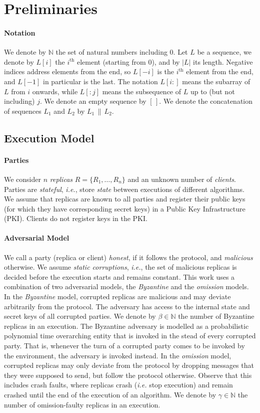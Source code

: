 \documentclass[pdflatex,sn-mathphys-num]{sn-jnl}%
\theoremstyle{thmstyleone}%
\theoremstyle{thmstyletwo}%
\theoremstyle{thmstylethree}%
\newcommand{\concat}{\,\|\,}
\newcommand{\BN}{\ensuremath{\mathbb{N}}\xspace}
\newcommand{\replicas}{\ensuremath{R}\xspace}
\newcommand{\dotparagraph}[1]{\paragraph*{#1}}
\let\oldbeta\beta
\renewcommand{\beta}{\ensuremath{\oldbeta}\xspace}
\let\oldgamma\gamma
\renewcommand{\gamma}{\ensuremath{\oldgamma}\xspace}
\begin{document}
\section{Preliminaries}

\dotparagraph{Notation}
We denote by \BN the set of natural numbers including $0$.
Let $L$ be a sequence, we denote by $L[i]$ the $i^\text{th}$ element (starting from $0$),
and by $|L|$ its length.
Negative indices address elements from the end, so $L[-i]$ is the $i^\text{th}$ element from
the end, and $L[-1]$ in particular is the last.
The notation $L[i{:}]$ means the
subarray of $L$ from $i$ onwards, while $L[{:}j]$ means the subsequence of $L$ up to (but not including) $j$.
We denote an empty sequence by $[\,]$.
We denote the concatenation of sequences $L_1$ and $L_2$ by $L_1 \concat L_2$.

\subsection{Execution Model}\label{sec:system}

\dotparagraph{\textbf{Parties}}
We consider $n$ \emph{replicas} $\replicas=\{\replicas_1,\ldots,\replicas_n\}$ and an unknown number of \emph{clients}. Parties are \emph{stateful}, \textit{i.e.}, store \emph{state} between executions of different algorithms.
We assume that replicas are known to all parties and register their public keys (for which they have corresponding secret keys) in a Public Key Infrastructure (PKI). Clients do not register keys in the PKI.

\dotparagraph{\textbf{Adversarial Model}}
We call a party (replica or client) \emph{honest}, if it follows the protocol, and \emph{malicious} otherwise.
We assume \emph{static corruptions},  \textit{i.e.}, the set of malicious replicas is decided before the execution starts and remains constant.
This work uses a combination of two adversarial models, the \emph{Byzantine} and the \emph{omission} models.
In the \emph{Byzantine} model, corrupted replicas are malicious and may deviate arbitrarily from the protocol. The adversary has access to the internal state and secret keys of all corrupted parties. We denote by $\beta \in \BN$ the  number of Byzantine replicas in an execution.
The Byzantine adversary is modelled as a probabilistic polynomial time overarching entity that is invoked in the stead of every corrupted party.
That is, whenever the turn of a corrupted party comes to be invoked by the environment, the adversary is invoked instead.
In the \emph{omission} model, corrupted replicas may only deviate from the protocol by dropping messages that they were supposed to send, but follow the protocol otherwise. Observe that this includes crash faults, where replicas crash (\textit{i.e.} stop execution) and remain crashed until the end of the execution of an algorithm. We denote by $\gamma \in \BN$ the number of omission-faulty replicas in an execution.
\end{document}
